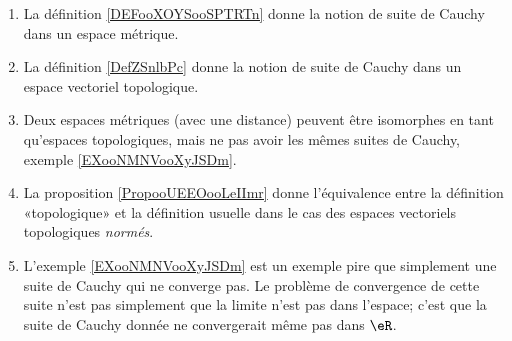      \label{THMooOCXTooWenIJE}
\begin{enumerate}
    \item
        La définition \ref{DEFooXOYSooSPTRTn} donne la notion de suite de Cauchy dans un espace métrique.
    \item
        La définition \ref{DefZSnlbPc} donne la notion de suite de Cauchy dans un espace vectoriel topologique.
    \item
        Deux espaces métriques (avec une distance) peuvent être isomorphes en tant qu'espaces topologiques, mais ne pas avoir les mêmes suites de Cauchy, exemple \ref{EXooNMNVooXyJSDm}.
    \item
        La proposition \ref{PropooUEEOooLeIImr} donne l'équivalence entre la définition «topologique» et la définition usuelle dans le cas des espaces vectoriels topologiques \emph{normés}.
    \item
        L'exemple \ref{EXooNMNVooXyJSDm} est un exemple pire que simplement une suite de Cauchy qui ne converge pas. Le problème de convergence de cette suite n'est pas simplement que la limite n'est pas dans l'espace; c'est que la suite de Cauchy donnée ne convergerait même pas dans \( \eR\).
\end{enumerate}
